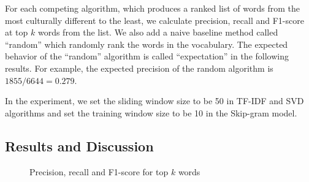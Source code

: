 For each competing algorithm, which produces a ranked list of words from
the most culturally different to the least, we calculate precision, recall
and F1-score at top $k$ words from the list. We also add a naive baseline
method called ``random'' which randomly rank the words in the vocabulary.
The expected behavior of the ``random'' algorithm is called ``expectation''
in the following results. For example, the expected precision of the random
algorithm is $1855/6644=0.279$.

In the experiment, we set the sliding window size to be 50 in TF-IDF and
SVD algorithms and set the training window size to be 10 in the Skip-gram model.
%

\subsection{Results and Discussion}

\begin{figure}[th]
\hfill
{}\hfill
{}
\caption{Precision, recall and F1-score for top $k$ words}
\label{fig:results}
\end{figure}

